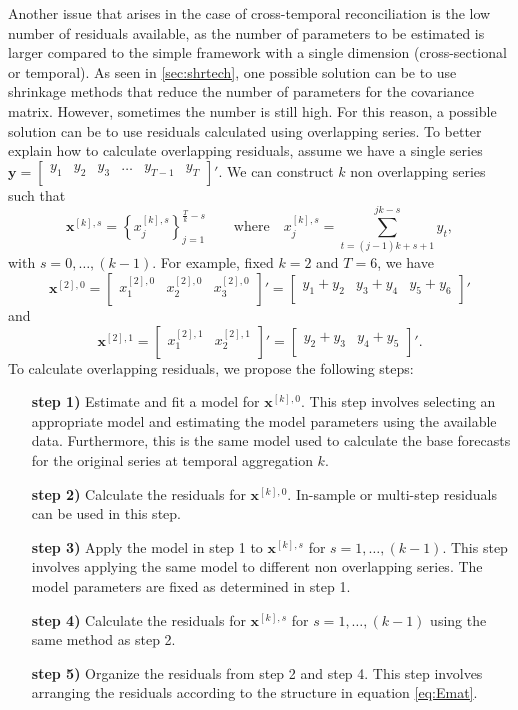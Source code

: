 \documentclass[a4paper,11pt]{article}
\newcommand{\xvet}{\bm{x}}
\newcommand{\yvet}{\bm{y}}
\theoremstyle{definition}
\begin{document}
Another issue that arises in the case of cross-temporal reconciliation is the low number of residuals available, as the number of parameters to be estimated is larger compared to the simple framework with a single dimension (cross-sectional or temporal). As seen in \autoref{sec:shrtech}, one possible solution can be to use shrinkage methods that reduce the number of parameters for the covariance matrix. However, sometimes the number is still high. For this reason, a possible solution can be to use residuals calculated using overlapping series. To better explain how to calculate overlapping residuals, assume we have a single series
$
	\yvet = \begin{bmatrix}
		y_1 & y_2 & y_3 & \dots & y_{T-1} & y_{T} \\
	\end{bmatrix}'.
$
We can construct $k$ non overlapping series such that
$$
	\xvet^{[k], s} = \left\{x^{[k],s}_{j}\right\}_{j = 1}^{\frac{T}{k}-s} \qquad \mathrm{where} \quad x^{[k],s}_{j} = \sum_{t = (j-1)k+s+1}^{jk-s} y_t,
$$
with $s = 0, \dots, (k-1)$.
For example, fixed $k = 2$ and $T = 6$, we have
$$
	\xvet^{[2], 0} = \begin{bmatrix}
		x_1^{[2], 0} & x_2^{[2], 0} & x_{3}^{[2], 0} \\
	\end{bmatrix}' =\begin{bmatrix}
		y_1 + y_2 & y_3 + y_4 & y_5 + y_6 \\
	\end{bmatrix}'
$$
and
$$
	\xvet^{[2], 1} = \begin{bmatrix}
		x_1^{[2], 1} & x_2^{[2], 1} \\
	\end{bmatrix}' =\begin{bmatrix}
		y_2 + y_3 & y_4 + y_5 \\
	\end{bmatrix}'.
$$
To calculate overlapping residuals, we propose the following steps:
\begin{itemize}[leftmargin = 2.5cm, nosep]
	\item[\textbf{step 1)}] Estimate and fit a model for $\xvet^{[k], 0}$. This step involves selecting an appropriate model and estimating the model parameters using the available data. Furthermore, this is the same model used to calculate the base forecasts for the original series at temporal aggregation $k$.
	\item[\textbf{step 2)}] Calculate the residuals for $\xvet^{[k], 0}$. In-sample or multi-step residuals can be used in this step.
	\item[\textbf{step 3)}] Apply the model in step 1 to $\xvet^{[k], s}$ for $s = 1, \dots, (k-1)$. This step involves applying the same model to different non overlapping series. The model parameters are fixed as determined in step 1.
	\item[\textbf{step 4)}] Calculate the residuals for $\xvet^{[k], s}$ for $s = 1, \dots, (k-1)$ using the same method as step 2.
	\item[\textbf{step 5)}] Organize the residuals from step 2 and step 4. This step involves arranging the residuals according to the structure in equation \eqref{eq:Emat}.
\end{itemize}
\end{document}

